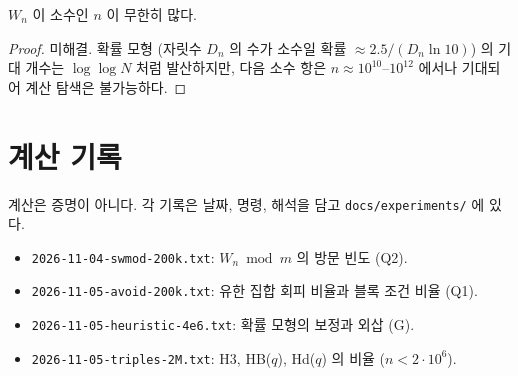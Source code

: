 \begin{theorem}[목표 추측, G]
  \label{thm:main}
  \notready
  \(W_n\) 이 소수인 \(n\) 이 무한히 많다.
\end{theorem}
\begin{proof}
  미해결. 확률 모형 (자릿수 \(D_n\) 의 수가 소수일 확률 \(\approx 2.5 / (D_n \ln 10)\)) 의 기대 개수는
  \(\log \log N\) 처럼 발산하지만, 다음 소수 항은 \(n \approx 10^{10}\)--\(10^{12}\) 에서나 기대되어 계산 탐색은 불가능하다.
\end{proof}

\chapter{계산 기록}

계산은 증명이 아니다. 각 기록은 날짜, 명령, 해석을 담고 \texttt{docs/experiments/} 에 있다.
\begin{itemize}
  \item \texttt{2026-11-04-swmod-200k.txt}: \(W_n \bmod m\) 의 방문 빈도 (Q2).
  \item \texttt{2026-11-05-avoid-200k.txt}: 유한 집합 회피 비율과 블록 조건 비율 (Q1).
  \item \texttt{2026-11-05-heuristic-4e6.txt}: 확률 모형의 보정과 외삽 (G).
  \item \texttt{2026-11-05-triples-2M.txt}: H3, HB(\(q\)), Hd(\(q\)) 의 비율 (\(n < 2 \cdot 10^6\)).
\end{itemize}
